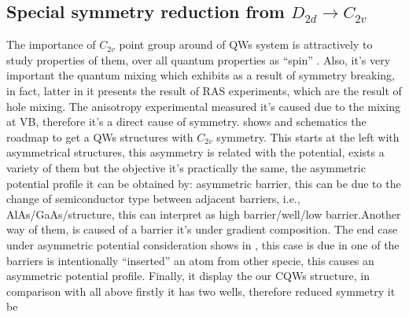 \subsection{Special symmetry reduction from $D_{2d}\to C_{2v}$}
\label{subsubsec:chapter-2-special-symmetry}
\vspace{-10mm} 
The importance of $C_{2v}$ point group around of QWs system is attractively to study properties of them, over all quantum properties as ``spin'' \cite{andrada1997spin,luo2015supercoupling,ivchenko2008spinphoto,glazov2018electron,winkler2003spin,ohrmann2004anomalousspin}. Also, it's very important the quantum mixing which exhibits as a result of symmetry breaking, in fact, latter in  it presents the result of RAS experiments,  which are the result of hole mixing. The anisotropy experimental measured it's caused due to the mixing at \gls{VB}, therefore it's a direct cause of symmetry.  shows and schematics the roadmap to get a QWs structures with $C_{2v}$ symmetry. This starts at the left with asymmetrical structures, this asymmetry is related with the potential, exists a variety of them but the objective it's practically the same, the asymmetric potential profile it can be obtained by: asymmetric barrier, this can be due to the change of semiconductor type between adjacent barriers, i.e.,  AlAs/GaAs/\algaas structure, this can interpret as high barrier/well/low barrier\cite{koopmans1998microscopic}.Another way of them,  is caused of a barrier  it's under gradient composition\cite{english2013effect,eldridge2011spinorbit}. The end case under asymmetric potential consideration shows in , this case is due in one of the barriers is intentionally ``inserted'' an atom from other specie\cite{yu2015tuning}, this causes an asymmetric potential profile. Finally, it display the our CQWs structure, in comparison with all above firstly it has two wells, therefore reduced symmetry it be 

